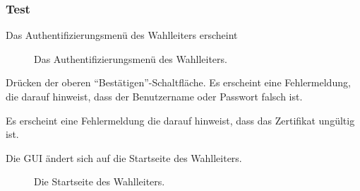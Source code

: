 \documentclass[parskip=full]{scrartcl}
\begin{document}
\subsubsection{Test}
		{Das Authentifizierungsmenü des Wahlleiters erscheint}

\begin{figure}[h!]
	\caption{\label{fig:sup_authentication}
		Das Authentifizierungsmenü des Wahlleiters.
	}
\end{figure}

\teststep{}
		{Drücken der oberen \enquote{Bestätigen}-Schaltfläche.}
		{Es erscheint eine Fehlermeldung, die darauf hinweist, dass der Benutzername oder Passwort falsch ist.}

		{Es erscheint eine Fehlermeldung die darauf hinweist, dass das Zertifikat ungültig ist.}

		{Die GUI ändert sich auf die Startseite des Wahlleiters.}

\begin{figure}[h!]
	\caption{\label{fig:sup_frontpage}
		Die Startseite des Wahlleiters.
	}
\end{figure}
		
\end{document}
